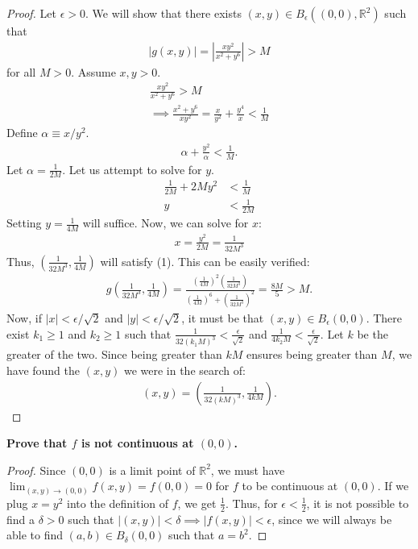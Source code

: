 \documentclass[12pt]{article}
\begin{document}
\begin{proof}
      Let $\epsilon>0$. We will show that there exists $(x, y)\in B_{\epsilon}((0, 0), \mathbb{R}^{2})$ such that
\begin{align}
|g(x, y)|=\left|\frac{xy^{2}}{x^{2}+y^{6}}\right|>M
\end{align}
for all $M>0$. Assume $x, y>0$. 
\begin{align*}
\frac{xy^{2}}{x^{2}+y^{6}}>M \\
\implies \frac{{x^{2}+y^{6}}}{xy^{2}}=\frac{x}{y^{2}}+\frac{y^{4}}{x}< \frac{1}{M}
\end{align*}
Define $\alpha\equiv x/y^{2}$.
\begin{align*}
\alpha+\frac{y^{2}}{\alpha}< \frac{1}{M}.
\end{align*}
Let $\alpha=\frac{1}{2M}$. Let us attempt to solve for $y$.
\begin{align*}
\frac{1}{2M} +2My^{2}&< \frac{1}{M} \\
y&<\frac{1}{2M}
\end{align*}
Setting $y=\frac{1}{4M}$ will suffice. Now, we can solve for $x$:
\begin{align*}
x=\frac{y^{2}}{2M}=\frac{1}{32M^{3}}
\end{align*}
Thus, $\left( \frac{1}{32M^{3}}, \frac{1}{4M} \right)$ will satisfy (1). This can be easily verified:
\begin{align*}
g\left( \frac{1}{32M^{3}}, \frac{1}{4M} \right)={{\frac{{{{{{{\left({{{\frac{1}{{{4M}}}}}}\right)}}^{2}}}{\left({{{\frac{1}{{{{{32{M}^{3}}}}}}}}}\right)}}}}{{{{{{{\left({{{\frac{1}{{{4M}}}}}}\right)}}^{6}}}}+{{{{{\left({{{\frac{1}{{{{{32{M}^{3}}}}}}}}}\right)}}^{2}}}}}}}} = \frac{8M}{5}>M.
\end{align*}
Now, if $|x|< \epsilon/\sqrt{ 2 }$ and $|y|<\epsilon/\sqrt{ 2 }$, it must be that $(x, y)\in B_{\epsilon}(0, 0)$. There exist $k_{1}\geq1$ and $k_{2}\geq 1$ such that $\frac{1}{32(k_{1}M)^{3}}< \frac{\epsilon}{\sqrt{ 2 }}$ and $\frac{1}{4k_{2}M}< \frac{\epsilon}{\sqrt{ 2 }}$. Let $k$ be the greater of the two. Since being greater than $kM$ ensures being greater than $M$, we have found the $(x, y)$ we were in the search of:
\begin{align*}
(x, y)=\left( \frac{1}{32(kM)^{3}}, \frac{1}{4kM} \right).
\end{align*}
\end{proof}

{\bf 
Prove that $f$ is not continuous at $(0, 0)$.}

\begin{proof}
      Since $(0, 0)$ is a limit point of $\mathbb{R}^{2}$, we must have $\lim_{ (x, y) \to (0, 0) }f(x, y)=f(0, 0)=0$ for $f$ to be continuous at $(0, 0)$. If we plug $x=y^{2}$ into the definition of $f$, we get $\frac{1}{2}$. Thus, for $\epsilon< \frac{1}{2}$, it is not possible to find a $\delta>0$ such that $|(x, y)|<\delta \implies |f(x, y)|<\epsilon$, since we will always be able to find $(a, b)\in B_{\delta}(0, 0)$ such that $a=b^{2}$. 
\end{proof}
\end{document}

